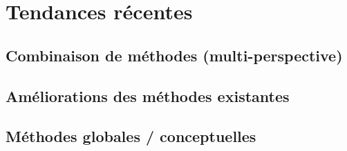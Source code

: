 \documentclass[12pt,a4paper]{article}
\begin{document}
\section*{Tendances récentes}

\subsection*{Combinaison de méthodes (multi-perspective)}

\subsection*{Améliorations des méthodes existantes}

\subsection*{Méthodes globales / conceptuelles}
\end{document}
